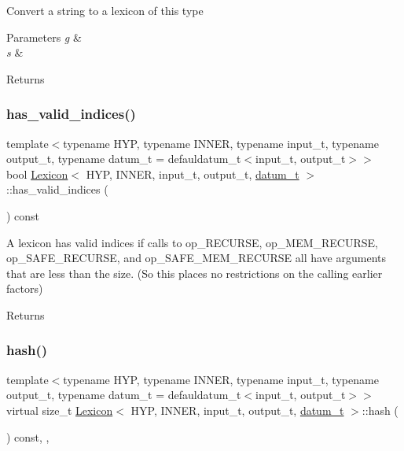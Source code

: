 Convert a string to a lexicon of this type 
\begin{DoxyParams}{Parameters}
{\em g} & \\
\hline
{\em s} & \\
\hline
\end{DoxyParams}
\begin{DoxyReturn}{Returns}

\end{DoxyReturn}
\mbox{\label{class_lexicon_a7b8ca67607285cc14608bd7148953d91}} 
\subsubsection{\texorpdfstring{has\+\_\+valid\+\_\+indices()}{has\_valid\_indices()}}
{\footnotesize\ttfamily template$<$typename H\+YP, typename I\+N\+N\+ER, typename input\+\_\+t, typename output\+\_\+t, typename datum\+\_\+t = defauldatum\+\_\+t$<$input\+\_\+t, output\+\_\+t$>$$>$ \\
bool \hyperlink{class_lexicon}{Lexicon}$<$ H\+YP, I\+N\+N\+ER, input\+\_\+t, output\+\_\+t, \hyperlink{class_bayesable_a9f1a6c0cd7855550fa10b1a8f13a5867}{datum\+\_\+t} $>$\+::has\+\_\+valid\+\_\+indices (\begin{DoxyParamCaption}{ }\end{DoxyParamCaption}) const\hspace{0.3cm}{\ttfamily [inline]}}

A lexicon has valid indices if calls to op\+\_\+\+R\+E\+C\+U\+R\+SE, op\+\_\+\+M\+E\+M\+\_\+\+R\+E\+C\+U\+R\+SE, op\+\_\+\+S\+A\+F\+E\+\_\+\+R\+E\+C\+U\+R\+SE, and op\+\_\+\+S\+A\+F\+E\+\_\+\+M\+E\+M\+\_\+\+R\+E\+C\+U\+R\+SE all have arguments that are less than the size. (So this places no restrictions on the calling earlier factors) \begin{DoxyReturn}{Returns}

\end{DoxyReturn}
\mbox{\label{class_lexicon_afbefa510e623ee4a407a1e1e04f42fb2}} 
\subsubsection{\texorpdfstring{hash()}{hash()}}
{\footnotesize\ttfamily template$<$typename H\+YP, typename I\+N\+N\+ER, typename input\+\_\+t, typename output\+\_\+t, typename datum\+\_\+t = defauldatum\+\_\+t$<$input\+\_\+t, output\+\_\+t$>$$>$ \\
virtual size\+\_\+t \hyperlink{class_lexicon}{Lexicon}$<$ H\+YP, I\+N\+N\+ER, input\+\_\+t, output\+\_\+t, \hyperlink{class_bayesable_a9f1a6c0cd7855550fa10b1a8f13a5867}{datum\+\_\+t} $>$\+::hash (\begin{DoxyParamCaption}{ }\end{DoxyParamCaption}) const\hspace{0.3cm}{\ttfamily [inline]}, {\ttfamily [override]}, {\ttfamily [virtual]}}




